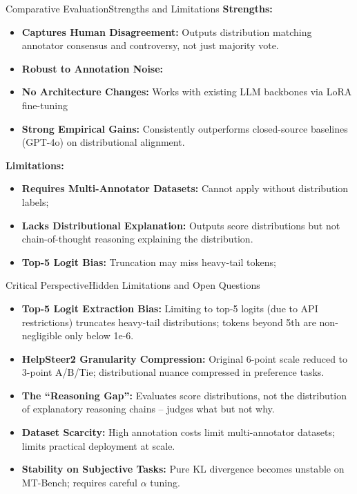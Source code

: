 \documentclass[10pt]{beamer}
\begin{document}
	\begin{frame}{Comparative Evaluation}{Strengths and Limitations}
	\textbf{Strengths:}
	\begin{itemize}
		\item \textbf{Captures Human Disagreement:} Outputs distribution matching annotator consensus and controversy, not just majority vote.
		\item \textbf{Robust to Annotation Noise:}
		\item \textbf{No Architecture Changes:} Works with existing LLM backbones via LoRA fine-tuning
		\item \textbf{Strong Empirical Gains:} Consistently outperforms closed-source baselines (GPT-4o) on distributional alignment.
	\end{itemize}
	\textbf{Limitations:}
	\begin{itemize}
		\item \textbf{Requires Multi-Annotator Datasets:} Cannot apply without distribution labels;
		\item \textbf{Lacks Distributional Explanation:} Outputs score distributions but not chain-of-thought reasoning explaining the distribution.
		\item \textbf{Top-5 Logit Bias:} Truncation may miss heavy-tail tokens; 
	\end{itemize}
	\end{frame}

	\begin{frame}{Critical Perspective}{Hidden Limitations and Open Questions}
	\begin{itemize}
		\item \textbf{Top-5 Logit Extraction Bias:} Limiting to top-5 logits (due to API restrictions) truncates heavy-tail distributions; tokens beyond 5th are non-negligible only below 1e-6.
		\item \textbf{HelpSteer2 Granularity Compression:} Original 6-point scale reduced to 3-point A/B/Tie; distributional nuance compressed in preference tasks.
		\item \textbf{The ``Reasoning Gap'':} Evaluates score distributions, not the distribution of explanatory reasoning chains -- judges what but not why.
		\item \textbf{Dataset Scarcity:} High annotation costs limit multi-annotator datasets; limits practical deployment at scale.
		\item \textbf{Stability on Subjective Tasks:} Pure KL divergence becomes unstable on MT-Bench; requires careful $\alpha$ tuning.
	\end{itemize}
	\end{frame}
	
\end{document}
